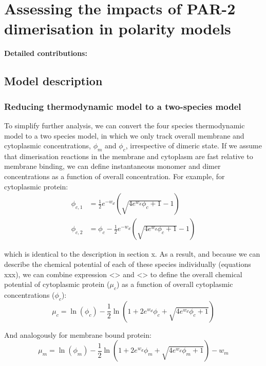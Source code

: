 \documentclass[12pt]{"report"}
\begin{document}
\clearpage
\chapter{Assessing the impacts of PAR-2 dimerisation in polarity models}

\textbf{Detailed contributions:}\\

\clearpage
\section{Model description}

\subsection{Reducing thermodynamic model to a two-species model} 

To simplify further analysis, we can convert the four species thermodynamic model to a two species model, in which we only track overall membrane and cytoplasmic concentrations, $\phi_m$ and $\phi_c$, irrespective of dimeric state. If we assume that dimerisation reactions in the membrane and cytoplasm are fast relative to membrane binding, we can define instantaneous monomer and dimer concentrations as a function of overall concentration. For example, for cytoplasmic protein:
\begin{align}
\phi_{c,1} &= \frac{1}{2}e^{-w_d}\left(\sqrt{4e^{w_d}\phi_c + 1} - 1\right)\\
\phi_{c,2} &= \phi_c - \frac{1}{2}e^{-w_d}\left(\sqrt{4e^{w_d}\phi_c + 1} - 1\right)
\end{align}

which is identical to the description in section x. As a result, and because we can describe the chemical potential of each of these species individually (equations xxx), we can combine expression <> and <> to define the overall chemical potential of cytoplasmic protein ($\mu_c$) as a function of overall cytoplasmic concentrations ($\phi_c$):
\begin{equation}
\mu_c = \ln(\phi_c) - \frac{1}{2}\ln\left(1 + 2e^{w_d}\phi_c + \sqrt{4e^{w_d}\phi_c + 1}\right)
\end{equation}

And analogously for membrane bound protein: 
\begin{equation}
\mu_m = \ln(\phi_m) - \frac{1}{2}\ln\left(1 + 2e^{w_d}\phi_m + \sqrt{4e^{w_d}\phi_m + 1}\right) - w_m
\end{equation}
\end{document}
